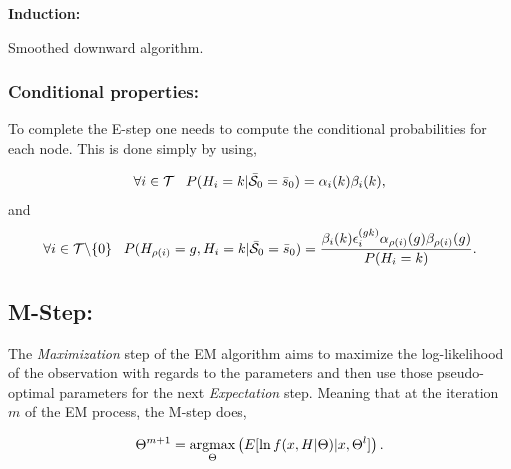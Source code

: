 \documentclass[a4paper,11pt]{report}
\begin{document}
{\begin{center}
\begin{algorithm}
						\textbf{Induction:}\\
						\caption{Smoothed downward algorithm.}
						\label{algo:Smoothed downward}		
					\end{algorithm}        
				\end{center}
				
			\subsubsection{Conditional properties:}
				\label{subsubsec:SHMT/Learning/E/Cond}
				
				To complete the E-step one needs to compute the conditional probabilities for each node. This is done simply by using,
				
				\begin{equation}
				  \forall i \in \mathcal{T} \;\;\; P(H_{i}=k | \bar{\mathcal{S}}_{0}=\bar{s}_{0}) = \alpha_{i}(k) \beta_{i}(k),
				  \label{eq:Estep cond proba node}
				\end{equation}
				and
				\begin{equation}
				  \forall i \in \mathcal{T}\backslash\{0\} 
				  \;\;\; P(H_{\rho(i)}=g, H_{i}=k | \bar{\mathcal{S}}_{0}=\bar{s}_{0}) = \frac{\beta_{i}(k)\epsilon_{i}^{(gk)}\alpha_{\rho(i)}(g)\beta_{\rho(i)}(g)}{P(H_{i}=k)}.
				  \label{eq:E-step cond proba and parent}
				\end{equation}
		
		\subsection{M-Step:}
			\label{subsec:SHMT/Learning/M}
			
			The \textit{Maximization} step of the EM algorithm aims to maximize the log-likelihood of the observation with regards to the parameters and then use those pseudo-optimal parameters for the next \textit{Expectation} step. Meaning that at the iteration $m$ of the EM process, the M-step does,
			
			\begin{equation}
				\Theta^{m+1} = \mathop{\rm argmax}_{\Theta} \left(E[\ln f(x,H|\Theta)|x,\Theta^{l}] \right).
				\label{eq:Mstep argax theta}
			\end{equation}
			
}
\end{document}
